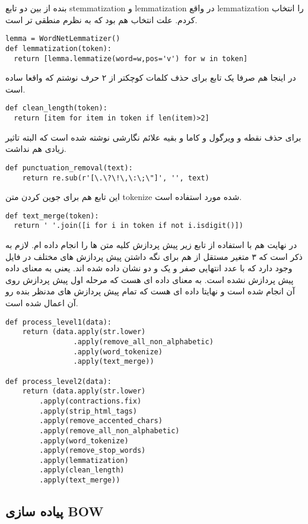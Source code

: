 \documentclass{article}[12pt]
\begin{document}
بنده از بین دو تابع stemmatization و 
lemmatization 
در واقع lemmatization را انتخاب کردم. علت انتخاب هم بود که به نظرم منطقی تر است. 
\begin{verbatim}
lemma = WordNetLemmatizer()
def lemmatization(token):
  return [lemma.lemmatize(word=w,pos='v') for w in token]
\end{verbatim}

در اینجا هم صرفا یک تابع برای حذف کلمات کوچکتر از ۲ حرف نوشتم که واقعا ساده است. 
\begin{verbatim}
def clean_length(token):
  return [item for item in token if len(item)>2]
\end{verbatim}

برای حذف نقطه و ویرگول و کاما و بقیه علائم نگارشی نوشته شده است که البته تاثیر زیادی هم نداشت. 
\begin{verbatim}
def punctuation_removal(text):
    return re.sub(r'[\.\?\!\,\:\;\"]', '', text)
\end{verbatim}

این تابع هم برای جوین کردن متن tokenize شده مورد استفاده است. 
\begin{verbatim}
def text_merge(token):
  return ' '.join([i for i in token if not i.isdigit()])
\end{verbatim}

در نهایت هم با استفاده از تابع زیر پیش پردازش کلیه متن ها را انجام داده ام. لازم به ذکر است که ۳ متغیر مستقل از هم برای نگه داشتن پیش پردازش های مختلف در فایل وجود دارد که با عدد انتهایی صفر و یک و دو نشان داده شده اند. یعنی 
به معنای داده پیش پردازش نشده است. 
به معنای داده ای هست که مرحله اول پیش پردازش روی آن انجام شده است و نهایتا 
داده ای هست که تمام پیش پردازش های مدنظر بنده رو آن اعمال شده است. 

\begin{verbatim}
def process_level1(data):
    return (data.apply(str.lower)
                .apply(remove_all_non_alphabetic)
                .apply(word_tokenize)
                .apply(text_merge))

def process_level2(data):
    return (data.apply(str.lower)
        .apply(contractions.fix)
        .apply(strip_html_tags)
        .apply(remove_accented_chars)
        .apply(remove_all_non_alphabetic)
        .apply(word_tokenize)
        .apply(remove_stop_words)
        .apply(lemmatization)
        .apply(clean_length)
        .apply(text_merge))
\end{verbatim}

\subsection{پیاده سازی BOW}
\end{document}
